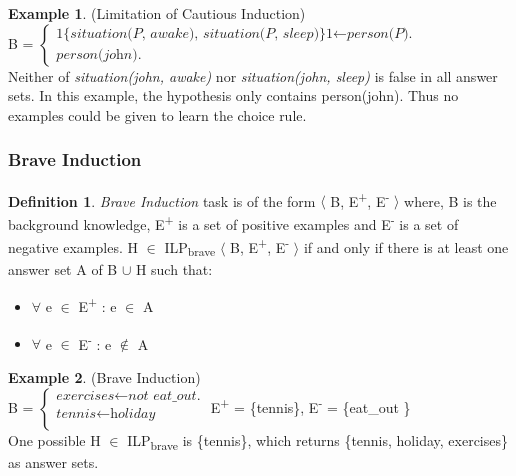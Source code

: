 \documentclass[11pt,twoside]{report}
\theoremstyle{plain}
\theoremstyle{definition}
\newtheorem{defn}[thm]{Definition} %
\newtheorem{examp}{Example}[section]
\begin{document}
\begin{examp} \normalfont (Limitation of Cautious Induction) \\

B = $\begin{cases}
	\textit{1\{situation(P, awake), situation(P, sleep)\}1} \leftarrow \textit{person(P).} \\
	\textit{person(john).}
      \end{cases}$ \\

Neither of \textit{situation(john, awake)} nor \textit{situation(john, sleep)} is false in all answer sets. 
In this example, the hypothesis only contains person(john). Thus no examples could be given to learn the choice rule.
\end{examp}

\label{limitation_cautious}

\subsubsection{Brave Induction}
\begin{defn} \label{def:brave_induction}
\textit{Brave Induction} task is of the form $\langle$ B, E\textsuperscript{+}, E\textsuperscript{-} $\rangle$ where, B is the background knowledge, E\textsuperscript{+} is a set of positive examples and E\textsuperscript{-} is a set of negative examples.
 H $\in$ ILP\textsubscript{brave} $\langle$ B, E\textsuperscript{+}, E\textsuperscript{-} $\rangle$ if and only if there is at least one answer set A of B $\cup$ H such that: \\
\begin{itemize}
\item $\forall$ e $\in$ E\textsuperscript{+} : e $\in$ A \\
\item $\forall$ e $\in$ E\textsuperscript{-} : e $\notin$ A \\
\end{itemize}
\end{defn}

\begin{examp} \normalfont (Brave Induction) \\

B = $\begin{cases}
	\textit{exercises}  \leftarrow \textit{not \ eat\_out.} \\
	\textit{tennis} \leftarrow \textit{holiday} \\
      \end{cases}$
E\textsuperscript{+} = \{tennis\},   E\textsuperscript{-} = \{eat\_out \} \\

One possible  H $\in$ ILP\textsubscript{brave} is \{tennis\}, which returns \{tennis, holiday, exercises\} as answer sets.
\end{examp}
\label{brave_induction_example}
\end{document}
